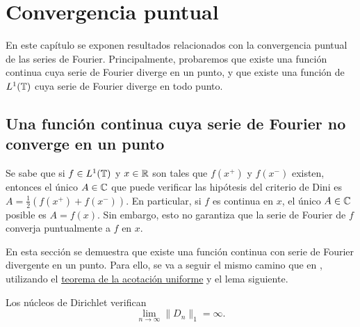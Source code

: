 \documentclass[a4paper, 12pt, oneside]{book}
\begin{document}
\chapter{Convergencia puntual}

En este capítulo se exponen resultados relacionados con la convergencia puntual de las series de Fourier. Principalmente, probaremos que existe una función continua cuya serie de Fourier diverge en un punto, y que existe una función de $L^1(\mathbb T)$ cuya serie de Fourier diverge en todo punto.

\section{Una función continua cuya serie de Fourier no converge en un punto}

Se sabe que si $f \in L^1(\mathbb T)$ y $x \in \mathbb R$ son tales que $f(x^+)$ y $f(x^-)$ existen, entonces el único $A \in \mathbb C$ que puede verificar las hipótesis del criterio de Dini es $A = \frac{1}{2}(f(x^+)+f(x^-))$. En particular, si $f$ es continua en $x$, el único $A \in \mathbb C$ posible es $A = f(x)$. Sin embargo, esto no garantiza que la serie de Fourier de $f$ converja puntualmente a $f$ en $x$.

En esta sección se demuestra que existe una función continua con serie de Fourier divergente en un punto. Para ello, se va a seguir el mismo camino que en \cite{fierros}, utilizando el \hyperref[1.2.2]{\color{blue}teorema de la acotación uniforme} y el lema siguiente.

\begin{lemma}\label{2.1.1}
    Los núcleos de Dirichlet verifican \[\lim_{n \to \infty} \|D_n\|_1 = \infty.\]
\end{lemma}
\end{document}
